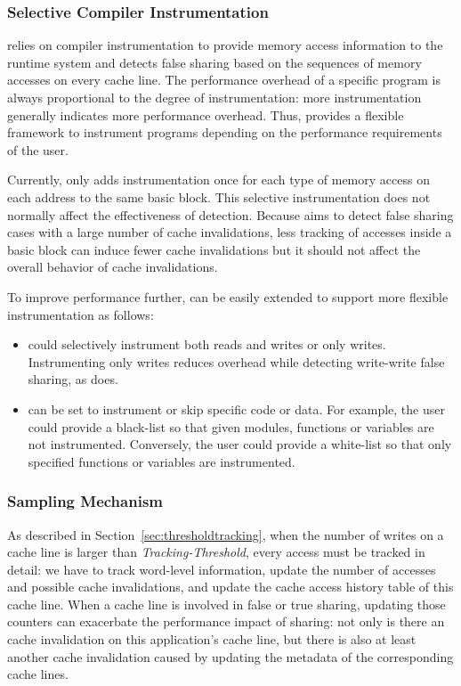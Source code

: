 \subsubsection{Selective Compiler Instrumentation}
\label{sec:selectinstrumentation}

\Predator{} relies on compiler instrumentation to provide memory access information to the runtime system 
and detects false sharing based on the sequences of memory accesses on every cache line. 
The performance overhead of a specific program is always proportional to the degree of instrumentation: more instrumentation generally indicates more performance overhead. 
Thus, \Predator{} provides a flexible framework to instrument programs depending on the performance requirements of the user.

Currently, \Predator{} only adds instrumentation once for each type of memory access on each address 
to the same basic block. 
This selective instrumentation does not normally affect the effectiveness of detection. 
Because \Predator{} aims to detect false sharing cases with a large number of cache invalidations,
less tracking of accesses inside a basic block can induce fewer cache invalidations 
but it should not affect the overall behavior of cache invalidations. 

To improve performance further,
\Predator{} can be easily extended to support more flexible instrumentation as follows:
\begin{itemize}
\item
\Predator{} could selectively instrument both reads and writes or only writes.
Instrumenting only writes reduces overhead while detecting write-write false sharing, 
as \Sheriff{} does. 
\item
\Predator{} can be set to instrument or skip specific code or data. 
For example, the user could provide a black-list so that given modules,
functions or variables are not instrumented. 
Conversely, the user could provide a white-list so that only specified functions or variables are instrumented. 
\end{itemize}

\subsubsection{Sampling Mechanism}
\label{sec:sample}
As described in Section~\ref{sec:thresholdtracking}, when the number of writes on a cache line is larger than {\it Tracking-Threshold}, every
access must be tracked in detail: we have to track word-level 
information, update the number of accesses and possible cache invalidations, and update the cache access history table
of this cache line.  When a cache line is involved in false or true sharing, updating those counters can exacerbate the performance impact of sharing: not only is there an cache invalidation on this application's cache line, but there is also at least another cache invalidation caused by updating the metadata of the corresponding cache lines.


